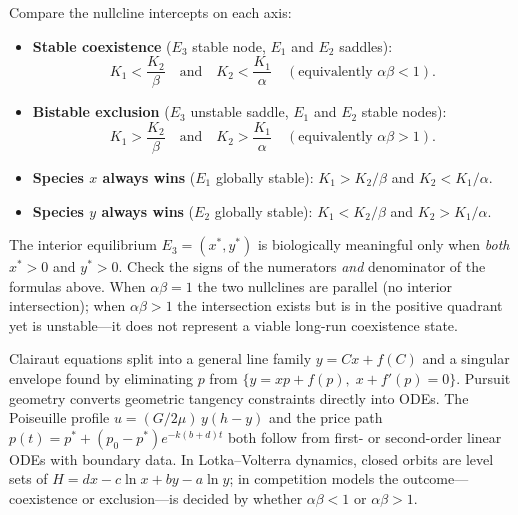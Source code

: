 \begin{methodbox}
Compare the nullcline intercepts on each axis:
\begin{itemize}[leftmargin=1.4em, itemsep=3pt]
  \item \textbf{Stable coexistence} ($E_3$ stable node, $E_1$ and $E_2$ saddles):
        \[
          K_1 < \frac{K_2}{\beta} \quad\text{and}\quad K_2 < \frac{K_1}{\alpha}
          \quad (\text{equivalently } \alpha\beta < 1).
        \]
  \item \textbf{Bistable exclusion} ($E_3$ unstable saddle, $E_1$ and $E_2$ stable nodes):
        \[
          K_1 > \frac{K_2}{\beta} \quad\text{and}\quad K_2 > \frac{K_1}{\alpha}
          \quad (\text{equivalently } \alpha\beta > 1).
        \]
  \item \textbf{Species $x$ always wins} ($E_1$ globally stable):
        $K_1 > K_2/\beta$ and $K_2 < K_1/\alpha$.
  \item \textbf{Species $y$ always wins} ($E_2$ globally stable):
        $K_1 < K_2/\beta$ and $K_2 > K_1/\alpha$.
\end{itemize}
\end{methodbox}

\begin{warningbox}
The interior equilibrium $E_3 = (x^*, y^*)$ is biologically meaningful only
when \emph{both} $x^* > 0$ and $y^* > 0$. Check the signs of the numerators
\emph{and} denominator of the formulas above. When $\alpha\beta = 1$ the two
nullclines are parallel (no interior intersection); when $\alpha\beta > 1$ the
intersection exists but is in the positive quadrant yet is unstable---it does not
represent a viable long-run coexistence state.
\end{warningbox}

\vspace{0.6em}

\begin{conceptbox}
Clairaut equations split into a \textcolor{accentorange}{general line family
$y = Cx + f(C)$} and a \textcolor{accentorange}{singular envelope} found by
eliminating $p$ from $\{y = xp + f(p),\; x + f'(p) = 0\}$.
Pursuit geometry converts geometric tangency constraints directly into ODEs.
The Poiseuille profile \textcolor{accentorange}{$u = (G/2\mu)\,y(h-y)$} and the
price path \textcolor{accentorange}{$p(t) = p^* + (p_0 - p^*)e^{-k(b+d)t}$} both
follow from first- or second-order linear ODEs with boundary data.
In Lotka--Volterra dynamics, closed orbits are level sets of
\textcolor{accentorange}{$H = dx - c\ln x + by - a\ln y$}; in competition models
the outcome---\textcolor{accentorange}{coexistence or exclusion}---is decided by
whether $\alpha\beta < 1$ or $\alpha\beta > 1$.
\end{conceptbox}


